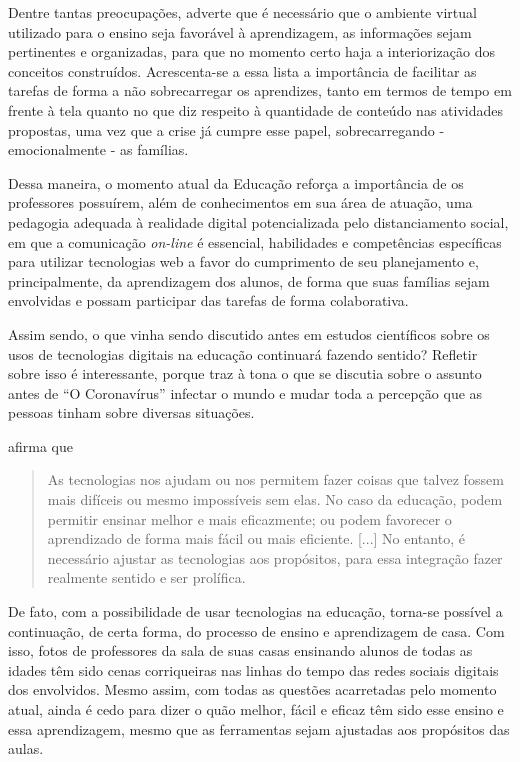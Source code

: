 \documentclass{textolivre}
\begin{document}
Dentre tantas preocupações, \textcite{almeida_o_2000} adverte que é necessário que o ambiente virtual utilizado para o ensino seja favorável à aprendizagem, as informações sejam pertinentes e organizadas, para que no momento certo haja a interiorização dos conceitos construídos. Acrescenta-se a essa lista a importância de facilitar as tarefas de forma a não sobrecarregar os aprendizes, tanto em termos de tempo em frente à tela quanto no que diz respeito à quantidade de conteúdo nas atividades propostas, uma vez que a crise já cumpre esse papel, sobrecarregando - emocionalmente - as famílias.   

Dessa maneira, o momento atual da Educação reforça a importância de os professores possuírem, além de conhecimentos em sua área de atuação, uma pedagogia adequada à realidade digital potencializada pelo distanciamento social, em que a comunicação \textit{on-line} é essencial, habilidades e competências específicas para utilizar tecnologias web a favor do cumprimento de seu planejamento e, principalmente, da aprendizagem dos alunos, de forma que suas famílias sejam envolvidas e possam participar das tarefas de forma colaborativa.

Assim sendo, o que vinha sendo discutido antes em estudos científicos sobre os usos de tecnologias digitais na educação continuará fazendo sentido? Refletir sobre isso é interessante, porque traz à tona o que se discutia sobre o assunto antes de “O Coronavírus” infectar o mundo e mudar toda a percepção que as pessoas tinham sobre diversas situações. 

\textcite[p. 73]{ribeiro_escrever_2018} afirma que 

\begin{quote}
    As tecnologias nos ajudam ou nos permitem fazer coisas que talvez fossem mais difíceis ou mesmo impossíveis sem elas. No caso da educação, podem permitir ensinar melhor e mais eficazmente; ou podem favorecer o aprendizado de forma mais fácil ou mais eficiente. [...] No entanto, é necessário ajustar as tecnologias aos propósitos, para essa integração fazer realmente sentido e ser prolífica. 
\end{quote}

De fato, com a possibilidade de usar tecnologias na educação, torna-se possível a continuação, de certa forma, do processo de ensino e aprendizagem de casa. Com isso, fotos de professores da sala de suas casas ensinando alunos de todas as idades têm sido cenas corriqueiras nas linhas do tempo das redes sociais digitais dos envolvidos. Mesmo assim, com todas as questões acarretadas pelo momento atual, ainda é cedo para dizer o quão melhor, fácil e eficaz têm sido esse ensino e essa aprendizagem, mesmo que as ferramentas sejam ajustadas aos propósitos das aulas. 
\end{document}
